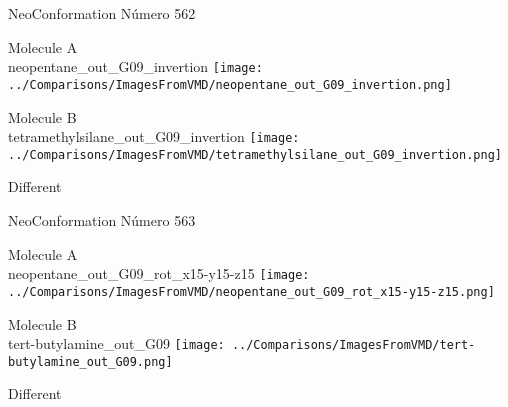 \vtab[-3cm]
\begin{center}
{\large NeoConformation \tab Número 562}
\end{center}
\begin{multicols}{2}
\begin{center}
Molecule A \\ 
neopentane\_out\_G09\_invertion
\texttt{[image: ../Comparisons/ImagesFromVMD/neopentane\_out\_G09\_invertion.png]}
\\
\vtab

\columnbreak
Molecule B \\ 
tetramethylsilane\_out\_G09\_invertion
\texttt{[image: ../Comparisons/ImagesFromVMD/tetramethylsilane\_out\_G09\_invertion.png]}
\\
\vtab


\end{center}
\end{multicols}
\begin{center}
\textcolor{NavyBlue}{\Large Different}
\end{center}

 \newpage

\vtab[-3cm]
\begin{center}
{\large NeoConformation \tab Número 563}
\end{center}
\begin{multicols}{2}
\begin{center}
Molecule A \\ 
neopentane\_out\_G09\_rot\_x15-y15-z15
\texttt{[image: ../Comparisons/ImagesFromVMD/neopentane\_out\_G09\_rot\_x15-y15-z15.png]}
\\
\vtab

\columnbreak
Molecule B \\ 
tert-butylamine\_out\_G09
\texttt{[image: ../Comparisons/ImagesFromVMD/tert-butylamine\_out\_G09.png]}
\\
\vtab


\end{center}
\end{multicols}
\begin{center}
\textcolor{NavyBlue}{\Large Different}
\end{center}

 \newpage


